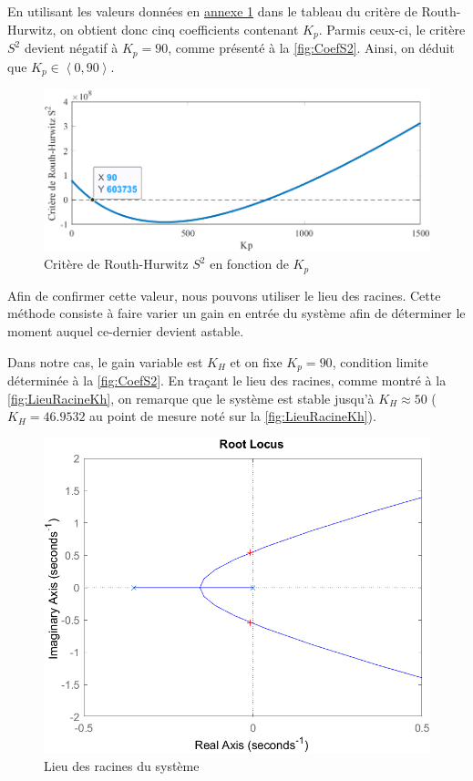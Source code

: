 \documentclass[a4paper,12pt]{article}
\begin{document}
    En utilisant les valeurs données en \hyperref[Annexe:ValList]{annexe 1} dans le tableau du critère de Routh-Hurwitz, on obtient donc cinq coefficients contenant $K_p$. Parmis ceux-ci, le critère $S^2$ devient négatif à $K_p = 90$, comme présenté à la \autoref{fig:CoefS2}. Ainsi, on déduit que $K_p \in \left< 0, 90 \right>$.
    \begin{figure}[H]
        \centering
        \includegraphics[width=16cm]{./img/plage_coefKp.png}
        \caption{Critère de Routh-Hurwitz $S^2$ en fonction de $K_p$\label{fig:CoefS2}}
    \end{figure}

    Afin de confirmer cette valeur, nous pouvons utiliser le lieu des racines. Cette méthode consiste à faire varier un gain en entrée du système afin de déterminer le moment auquel ce-dernier devient astable.
    
    Dans notre cas, le gain variable est $K_H$ et on fixe $K_p = 90$, condition limite déterminée à la \autoref{fig:CoefS2}. En traçant le lieu des racines, comme montré à la \autoref{fig:LieuRacineKh}, on remarque que le système est stable jusqu'à $K_H \approx 50$ ($K_H = 46.9532$ au point de mesure noté sur la \autoref{fig:LieuRacineKh}).
    \begin{figure}[H]
        \centering
        \includegraphics[width=13cm]{./img/planRacine_Kh.png}
        \caption{Lieu des racines du système\label{fig:LieuRacineKh}}
    \end{figure}
\end{document}
